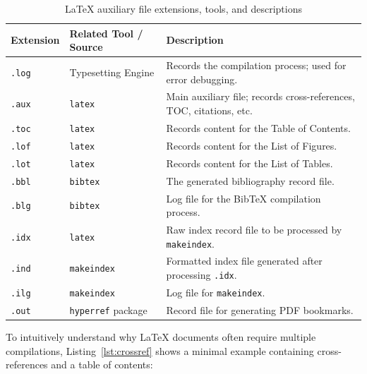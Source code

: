 \begin{table}[htbp]
    \centering
    \caption{\LaTeX{} auxiliary file extensions, tools, and descriptions}
    \label{tab:latex-aux}
    \begin{tabular}{llp{7.5cm}}
        \toprule
        \textbf{Extension} & \textbf{Related Tool / Source} & \textbf{Description}                                                \\
        \midrule
        \texttt{.log}      & Typesetting Engine             & Records the compilation process; used for error debugging.          \\
        \texttt{.aux}      & \texttt{latex}                 & Main auxiliary file; records cross-references, TOC, citations, etc. \\
        \texttt{.toc}      & \texttt{latex}                 & Records content for the Table of Contents.                          \\
        \texttt{.lof}      & \texttt{latex}                 & Records content for the List of Figures.                            \\
        \texttt{.lot}      & \texttt{latex}                 & Records content for the List of Tables.                             \\
        \texttt{.bbl}      & \texttt{bibtex}                & The generated bibliography record file.                             \\
        \texttt{.blg}      & \texttt{bibtex}                & Log file for the BibTeX compilation process.                        \\
        \texttt{.idx}      & \texttt{latex}                 & Raw index record file to be processed by \texttt{makeindex}.        \\
        \texttt{.ind}      & \texttt{makeindex}             & Formatted index file generated after processing \texttt{.idx}.      \\
        \texttt{.ilg}      & \texttt{makeindex}             & Log file for \texttt{makeindex}.                                    \\
        \texttt{.out}      & \texttt{hyperref} package      & Record file for generating PDF bookmarks.                           \\
        \bottomrule
    \end{tabular}
\end{table}

To intuitively understand why \LaTeX{} documents often require multiple compilations, Listing~\ref{lst:crossref} shows a minimal example containing cross-references and a table of contents:

